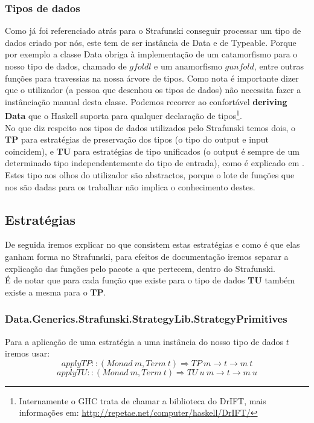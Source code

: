 \subsubsection{Tipos de dados}
Como já foi referenciado atrás para o Strafunski conseguir processar um tipo de dados criado por nós, este tem de ser instância de Data e de Typeable.
Porque por exemplo a classe Data obriga à implementação de um catamorfismo para o nosso tipo de dados, chamado de $gfoldl$ e um anamorfismo $gunfold$, entre outras
funções para travessias na nossa árvore de tipos. Como nota é importante dizer que o utilizador (a pessoa que desenhou os tipos de dados) não necessita
fazer a instânciação manual desta classe. Podemos recorrer ao confortável \textbf{deriving Data} que o Haskell suporta para qualquer declaração
de tipos\footnote{Internamente o GHC trata de chamar a biblioteca do DrIFT, mais informações em: \url{http://repetae.net/computer/haskell/DrIFT/}}.\\

No que diz respeito aos tipos de dados utilizados pelo Strafunski temos dois, o \textbf{TP} para estratégias de preservação dos tipos
(o tipo do output e input coincidem), e \textbf{TU} para estratégias de tipo unificados (o output é sempre de um determinado tipo independentemente do tipo de entrada),
como é explicado em \cite{Lammel:2002:DPF:570186.570187}.\\
Estes tipo aos olhos do utilizador são abstractos, porque o lote de funções que nos são dadas para os trabalhar não implica o conhecimento destes.

\subsection{Estratégias}
De seguida iremos explicar no que consistem estas estratégias e como é que elas ganham forma no Strafunski, para efeitos de documentação iremos separar a explicação
das funções pelo pacote a que pertecem, dentro do Strafunski.\\
É de notar que para cada função que existe para o tipo de dados \textbf{TU} também existe a mesma para o \textbf{TP}.

\subsubsection{Data.Generics.Strafunski.StrategyLib.StrategyPrimitives}

Para a aplicação de uma estratégia a uma instância do nosso tipo de dados $t$ iremos usar:
$$applyTP :: (Monad~m, Term~t) \Rightarrow TP~m \rightarrow t \rightarrow m~t$$
$$applyTU :: (Monad~m, Term~t) \Rightarrow TU~u~m \rightarrow t \rightarrow m~u$$


